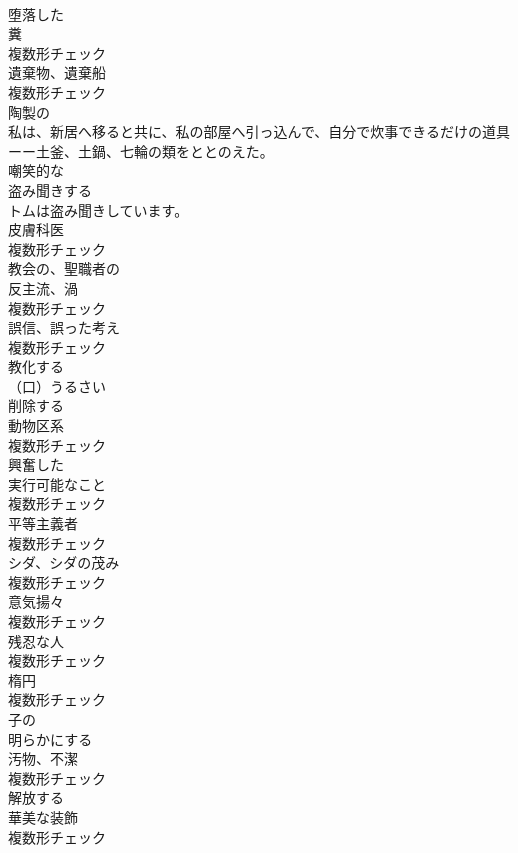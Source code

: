 \documentclass[8pt]{extreport}
\begin{document}
\begin{CJK}{UTF8}{min}
\\	[形容詞]	堕落した	
\\	[名詞]	糞	
\\	複数形チェック
\\	[名詞]	遺棄物、遺棄船	
\\	複数形チェック
\\	[形容詞]	陶製の	
\\	私は、新居へ移ると共に、私の部屋へ引っ込んで、自分で炊事できるだけの道具ーー土釜、土鍋、七輪の類をととのえた。	
\\	[形容詞]	嘲笑的な	
\\	[動詞]	盗み聞きする	
\\	トムは盗み聞きしています。	
\\	[名詞]	皮膚科医	
\\	複数形チェック
\\	[形容詞]	教会の、聖職者の	
\\	[名詞]	反主流、渦	
\\	複数形チェック
\\	[名詞]	誤信、誤った考え	
\\	複数形チェック
\\	[動詞]	教化する	
\\	[形容詞]	（口）うるさい	
\\	[動詞]	削除する	
\\	[名詞]	動物区系	
\\	複数形チェック
\\	[形容詞]	興奮した	
\\	[名詞]	実行可能なこと	
\\	複数形チェック
\\	[名詞]	平等主義者	
\\	複数形チェック
\\	[名詞]	シダ、シダの茂み	
\\	複数形チェック
\\	[名詞]	意気揚々	
\\	複数形チェック
\\	[名詞]	残忍な人	
\\	複数形チェック
\\	[名詞]	楕円	
\\	複数形チェック
\\	[形容詞]	子の	
\\	[動詞]	明らかにする	
\\	[名詞]	汚物、不潔	
\\	複数形チェック
\\	[動詞]	解放する	
\\	[名詞]	華美な装飾	
\\	複数形チェック

\end{CJK}
\end{document}
